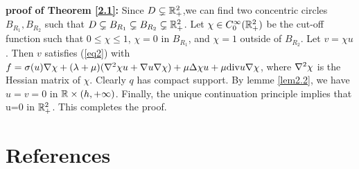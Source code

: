\documentclass[12pt]{iopart}
\begin{document}
 {\bf proof of Theorem \ref{2.1}:} Since $D\subsetneq{\mathbb{R}}^2_+$,we can find two concentric circles $B_{R_1},B_{R_2}$ such that $D\subsetneq B_{R_1}\subsetneq B_{R_2}  \subsetneq {\mathbb{R}}^2_+$. Let $\chi \in C_{0}^{\infty}({\mathbb{R}}^2_+)$ be the cut-off function such that $0 \leq \chi \leq 1$, $\chi=0$ in $B_{R_1}$, and $\chi=1$ outside of $B_{R_2}$.
Let $v=\chi u$.
Then $v$ satisfies (\ref{eq2}) with
 $f=\sigma(u)\nabla\chi+(\lambda+\mu)(\nabla^2 \chi u+ \nabla u \nabla\chi)+\mu\Delta\chi u +\mu\mathrm{div} u\nabla\chi$, where $\nabla^2 \chi$ is the Hessian matrix of $\chi$. Clearly $q$ has compact support. By lemme \ref{lem2.2}, we have $u=v=0$ in ${\mathbb{R}}\times(h,+\infty)$. Finally, the unique continuation principle
 implies that u=0 in ${\mathbb{R}}^2_+$. This completes the proof.
\finproof
\section*{References}

\end{document}
